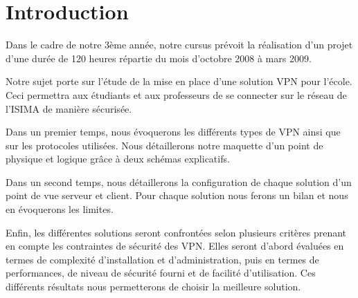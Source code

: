 \section*{Introduction}

Dans le cadre de notre 3ème année, notre cursus prévoit la réalisation d’un projet d’une durée de 120 heures répartie du mois d’octobre 2008 à mars 2009. 

Notre sujet porte sur l'étude de la mise en place d'une solution VPN pour l'école. Ceci permettra aux étudiants et aux professeurs de se connecter sur le réseau de l'ISIMA de manière sécurisée.


Dans un premier temps, nous évoquerons les différents types de VPN ainsi que sur les protocoles utilisées. Nous détaillerons notre maquette d'un point de physique et logique grâce à deux schémas explicatifs.


Dans un second temps, nous détaillerons la configuration de chaque solution d'un point de vue serveur et client. Pour chaque solution nous ferons un bilan et nous en évoquerons les limites. 


Enfin, les différentes solutions seront confrontées selon plusieurs critères prenant en compte les contraintes de sécurité des VPN. Elles seront d'abord évaluées en termes de complexité d'installation et d'administration, puis en termes de performances, de niveau de sécurité fourni et de facilité d'utilisation. Ces différents résultats nous permetterons de choisir la meilleure solution.




\pagebreak
